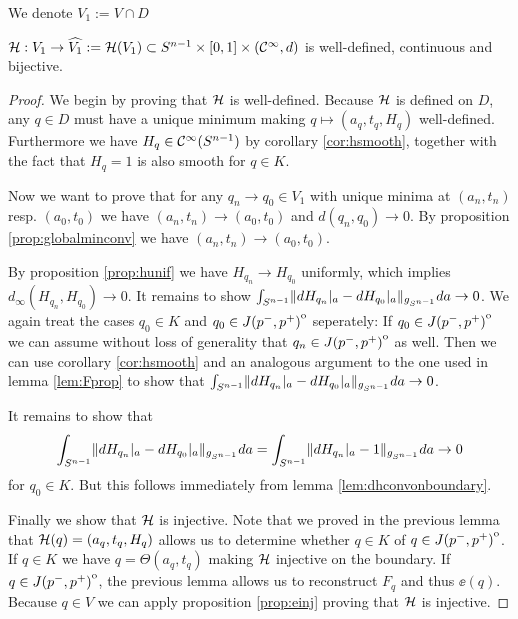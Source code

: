 We denote $V_1:=V\cap D$
\begin{lemma}
    ${\mathcal{H}}:V_1\to \widehat{V_1}:={\mathcal{H}}(V_1)\subset {S^{n-1}}\times [0,1]\times({\mathcal{C}}^\infty, d)$ is well-defined, continuous and bijective.
\end{lemma}
\begin{proof}
    We begin by proving that ${\mathcal{H}}$ is well-defined. Because ${\mathcal{H}}$ is defined on $D$, any $q\in D$ must have a unique minimum making $q\mapsto(a_q,t_q,H_q)$ well-defined. Furthermore we have $H_q\in {\mathcal{C}}^\infty({S^{n-1}})$ by corollary \ref{cor:hsmooth}, together with the fact that $H_q=1$ is also smooth for $q\in K$.

    Now we want to prove that for any $q_n\to q_0\in V_1$ with unique minima at $(a_n,t_n)$ resp. $(a_0,t_0)$ we have $(a_n,t_n) \to (a_0,t_0)$ and $d(q_n,q_0)\to 0$. By proposition \ref{prop:globalminconv} we have $(a_n,t_n) \to (a_0,t_0)$.
    
    By proposition \ref{prop:hunif} we have $H_{q_n}\to H_{q_0}$ uniformly, which implies $d_\infty(H_{q_n},H_{q_0})\to 0$. It remains to show $\int_{{S^{n-1}}} \lVert dH_{q_n}\rvert_a - dH_{q_0}\rvert_a \rVert_{g_{S^{n-1}}}da \to 0$. We again treat the cases $q_0\in K$ and $q_0\in {\kern0ptJ(p^-,p^+)}^{\mathrm{o}}$ seperately: If $q_0\in {\kern0ptJ(p^-,p^+)}^{\mathrm{o}}$ we can assume without loss of generality that $q_n\in {\kern0ptJ(p^-,p^+)}^{\mathrm{o}}$ as well. Then we can use corollary \ref{cor:hsmooth} and an analogous argument to the one used in lemma \ref{lem:Fprop} to show that $\int_{{S^{n-1}}} \lVert dH_{q_n}\rvert_a - dH_{q_0}\rvert_a \rVert_{g_{S^{n-1}}}da \to 0$.

    It remains to show that 
    \[
        \int_{{S^{n-1}}} \lVert dH_{q_n}\rvert_a - dH_{q_0}\rvert_a \rVert_{g_{S^{n-1}}}da = \int_{{S^{n-1}}} \lVert dH_{q_n}\rvert_a - 1\rVert_{g_{S^{n-1}}}da \to 0
    \] for $q_0\in K$. But this follows immediately from lemma \ref{lem:dhconvonboundary}.

    Finally we show that ${\mathcal{H}}$ is injective. Note that we proved in the previous lemma that ${\mathcal{H}}(q)=(a_q,t_q,H_q)$ allows us to determine whether $q\in K$ of $q\in {\kern0ptJ(p^-,p^+)}^{\mathrm{o}}$.
    If $q\in K$ we have $q = \Theta(a_q,t_q)$ making ${\mathcal{H}}$ injective on the boundary. If $q\in {\kern0ptJ(p^-,p^+)}^{\mathrm{o}}$, the previous lemma allows us to reconstruct $F_q$ and thus $\ee(q)$. Because $q\in V$ we can apply proposition \ref{prop:einj} proving that ${\mathcal{H}}$ is injective.
\end{proof}

